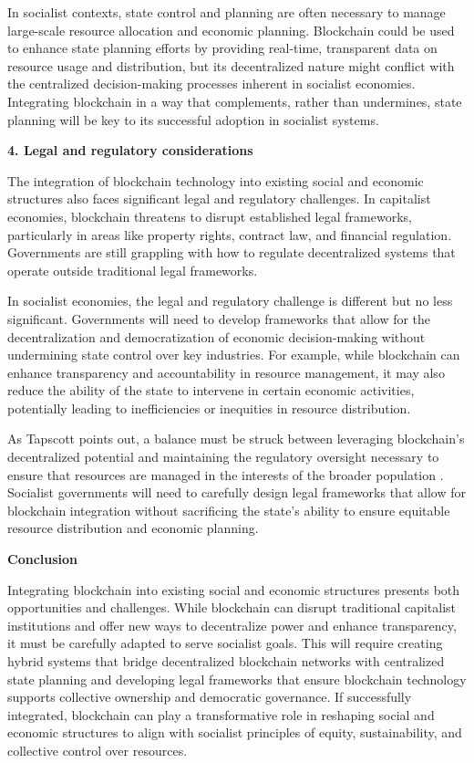 \begin{refsection}
In socialist contexts, state control and planning are often necessary to manage large-scale resource allocation and economic planning. Blockchain could be used to enhance state planning efforts by providing real-time, transparent data on resource usage and distribution, but its decentralized nature might conflict with the centralized decision-making processes inherent in socialist economies. Integrating blockchain in a way that complements, rather than undermines, state planning will be key to its successful adoption in socialist systems.

\textbf{4. Legal and regulatory considerations}

The integration of blockchain technology into existing social and economic structures also faces significant legal and regulatory challenges. In capitalist economies, blockchain threatens to disrupt established legal frameworks, particularly in areas like property rights, contract law, and financial regulation. Governments are still grappling with how to regulate decentralized systems that operate outside traditional legal frameworks.

In socialist economies, the legal and regulatory challenge is different but no less significant. Governments will need to develop frameworks that allow for the decentralization and democratization of economic decision-making without undermining state control over key industries. For example, while blockchain can enhance transparency and accountability in resource management, it may also reduce the ability of the state to intervene in certain economic activities, potentially leading to inefficiencies or inequities in resource distribution.

As Tapscott points out, a balance must be struck between leveraging blockchain’s decentralized potential and maintaining the regulatory oversight necessary to ensure that resources are managed in the interests of the broader population \cite[pp.~194-196]{tapscott2016}. Socialist governments will need to carefully design legal frameworks that allow for blockchain integration without sacrificing the state’s ability to ensure equitable resource distribution and economic planning.

\textbf{Conclusion}

Integrating blockchain into existing social and economic structures presents both opportunities and challenges. While blockchain can disrupt traditional capitalist institutions and offer new ways to decentralize power and enhance transparency, it must be carefully adapted to serve socialist goals. This will require creating hybrid systems that bridge decentralized blockchain networks with centralized state planning and developing legal frameworks that ensure blockchain technology supports collective ownership and democratic governance. If successfully integrated, blockchain can play a transformative role in reshaping social and economic structures to align with socialist principles of equity, sustainability, and collective control over resources.


\end{refsection}
